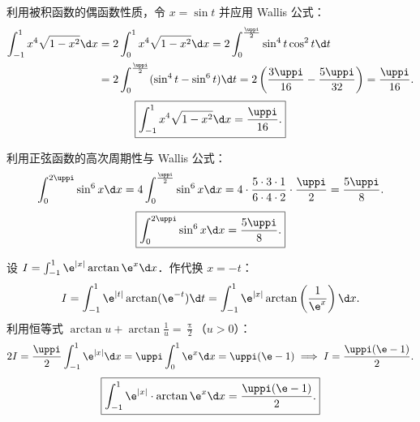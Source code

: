 \begin{solution}

    利用被积函数的偶函数性质，令 $x = \sin t$ 并应用 Wallis 公式：
    \begin{equation}
        \begin{aligned}
            \int_{-1}^1 x^4 \sqrt{1 - x^2} \d x & = 2\int_0^1 x^4 \sqrt{1 - x^2} \d x = 2\int_0^{\frac{\uppi}{2}} \sin^4 t \cos^2 t \d t                                             \\
                                                & = 2\int_0^{\frac{\uppi}{2}} (\sin^4 t - \sin^6 t) \d t = 2\left( \frac{3\uppi}{16} - \frac{5\uppi}{32} \right) = \frac{\uppi}{16}.
        \end{aligned}
    \end{equation}
    \begin{equation}
        \boxed{\int_{-1}^1 x^4 \sqrt{1 - x^2} \d x = \frac{\uppi}{16}.}
    \end{equation}


    利用正弦函数的高次周期性与 Wallis 公式：
    \begin{equation}
        \int_0^{2\uppi} \sin^6 x \d x = 4\int_0^{\frac{\uppi}{2}} \sin^6 x \d x = 4 \cdot \frac{5 \cdot 3 \cdot 1}{6 \cdot 4 \cdot 2} \cdot \frac{\uppi}{2} = \frac{5\uppi}{8}.
    \end{equation}
    \begin{equation}
        \boxed{\int_0^{2\uppi} \sin^6 x \d x = \frac{5\uppi}{8}.}
    \end{equation}


    设 $I = \int_{-1}^1 \e^{|x|}\arctan \e^x \d x$．作代换 $x = -t$：
    \begin{equation}
        I = \int_{-1}^1 \e^{|t|}\arctan(\e^{-t})\d t = \int_{-1}^1 \e^{|x|}\arctan\left( \frac{1}{\e^x} \right)\d x.
    \end{equation}
    利用恒等式 $\arctan u + \arctan\frac{1}{u} = \frac{\uppi}{2}$（$u > 0$）：
    \begin{equation}
        2I = \frac{\uppi}{2}\int_{-1}^1 \e^{|x|}\d x = \uppi \int_0^1 \e^x \d x = \uppi(\e - 1) \implies I = \frac{\uppi(\e - 1)}{2}.
    \end{equation}
    \begin{equation}
        \boxed{\int_{-1}^1 \e^{|x|} \cdot \arctan \e^x \d x = \frac{\uppi(\e - 1)}{2}.}
    \end{equation}



\end{solution}
